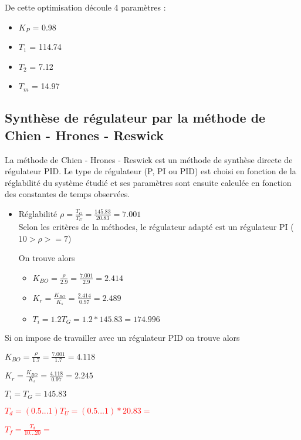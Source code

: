 De cette optimisation découle 4 paramètres :
\begin{itemize}
\item $K_{P}$ = 0.98
\item $T_{1}$ = 114.74
\item $T_{2}$ = 7.12
\item $T_{m}$ = 14.97
\end{itemize}

\subsection{Synthèse de régulateur par la méthode de Chien - Hrones - Reswick}
La méthode de Chien - Hrones - Reswick est un méthode de synthèse directe de régulateur PID. Le type de régulateur (P, PI ou PID) est choisi en fonction de la réglabilité du système étudié et ses paramètres sont ensuite calculée en fonction des constantes de temps observées. 

\begin{itemize}
\item Réglabilité $\rho = \frac{T_{G}}{T_{U}} = \frac{145.83}{20.83} = 7.001$\\
Selon les critères de la méthodes, le régulateur adapté est un régulateur PI ($10 > \rho >= 7$)

On trouve alors 
\begin{itemize}
\item $K_{BO} = \frac{\rho}{2.9} = \frac{7.001}{2.9} = 2.414$
\item $K_{r} = \frac{K_{BO}}{K_{s}} = \frac{2.414}{0.97} = 2.489$
\item $T_{i} = 1.2T_{G} = 1.2*145.83 = 174.996$
\end{itemize}
\end{itemize}

Si on impose de travailler avec un régulateur PID on trouve alors 
\begin{itemize}
\item $K_{BO} = \frac{\rho}{1.7} = \frac{7.001}{1.7} = 4.118$
\item $K_{r} = \frac{K_{BO}}{K_{s}} = \frac{4.118}{0.97} = 2.245$
\item $T_{i} = T_{G} = 145.83$

\textcolor{red}{\item $T_{d} = (0.5...1)T_{U} = (0.5...1)*20.83 = $
\item $T_{f} = \frac{T_{d}}{10...20} = $}
\end{itemize}
